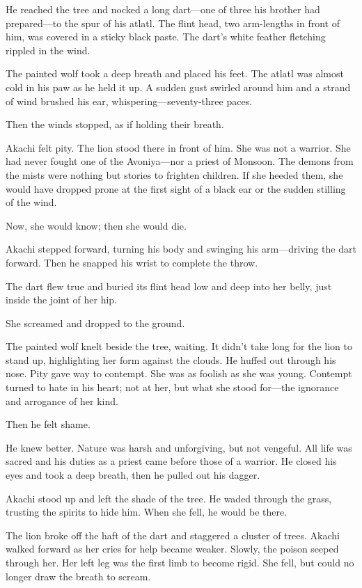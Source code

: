 He reached the tree and nocked a long dart---one of three his brother had prepared---to the spur of his atlatl. The flint head, two arm-lengths in front of him, was covered in a sticky black paste. The dart's white feather fletching rippled in the wind.

The painted wolf took a deep breath and placed his feet. The atlatl was almost cold in his paw as he held it up. A sudden gust swirled around him and a strand of wind brushed his ear, whispering---seventy-three paces.

Then the winds stopped, as if holding their breath.

Akachi felt pity. The lion stood there in front of him. She was not a warrior. She had never fought one of the Avoniya---nor a priest of Monsoon. The demons from the mists were nothing but stories to frighten children. If she heeded them, she would have dropped prone at the first sight of a black ear or the sudden stilling of the wind.

Now, she would know; then she would die.

Akachi stepped forward, turning his body and swinging his arm---driving the dart forward. Then he snapped his wrist to complete the throw.

The dart flew true and buried its flint head low and deep into her belly, just inside the joint of her hip.

She screamed and dropped to the ground.

The painted wolf knelt beside the tree, waiting. It didn't take long for the lion to stand up, highlighting her form against the clouds. He huffed out through his nose. Pity gave way to contempt. She was as foolish as she was young. Contempt turned to hate in his heart; not at her, but what she stood for---the ignorance and arrogance of her kind.

Then he felt shame.

He knew better. Nature was harsh and unforgiving, but not vengeful. All life was sacred and his duties as a priest came before those of a warrior. He closed his eyes and took a deep breath, then he pulled out his dagger.

Akachi stood up and left the shade of the tree. He waded through the grass, trusting the spirits to hide him. When she fell, he would be there.

The lion broke off the haft of the dart and staggered a cluster of trees. Akachi walked forward as her cries for help became weaker. Slowly, the poison seeped through her. Her left leg was the first limb to become rigid. She fell, but could no longer draw the breath to scream.


